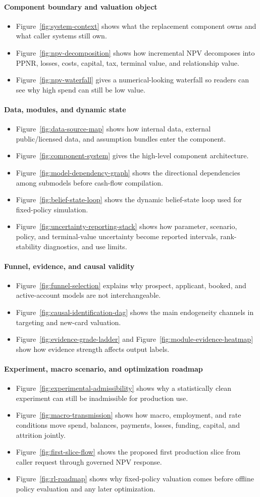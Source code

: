 \documentclass[11pt]{article}
\newcommand{\1}{\mathbf{1}}
\newcommand{\readerbox}[2]{\paragraph{#1}\begin{itemize}[leftmargin=1.5em,itemsep=0.1em,topsep=0.15em]#2\end{itemize}}
\begin{document}
\readerbox{Component boundary and valuation object}{
  \item Figure~\ref{fig:system-context} shows what the replacement component
        owns and what caller systems still own.
  \item Figure~\ref{fig:npv-decomposition} shows how incremental NPV decomposes
        into PPNR, losses, costs, capital, tax, terminal value, and relationship
        value.
  \item Figure~\ref{fig:npv-waterfall} gives a numerical-looking waterfall so
        readers can see why high spend can still be low value.
}
\readerbox{Data, modules, and dynamic state}{
  \item Figure~\ref{fig:data-source-map} shows how internal data, external
        public/licensed data, and assumption bundles enter the component.
  \item Figure~\ref{fig:component-system} gives the high-level component
        architecture.
  \item Figure~\ref{fig:model-dependency-graph} shows the directional
        dependencies among submodels before cash-flow compilation.
  \item Figure~\ref{fig:belief-state-loop} shows the dynamic belief-state loop
        used for fixed-policy simulation.
  \item Figure~\ref{fig:uncertainty-reporting-stack} shows how parameter,
        scenario, policy, and terminal-value uncertainty become reported
        intervals, rank-stability diagnostics, and use limits.
}
\readerbox{Funnel, evidence, and causal validity}{
  \item Figure~\ref{fig:funnel-selection} explains why prospect, applicant,
        booked, and active-account models are not interchangeable.
  \item Figure~\ref{fig:causal-identification-dag} shows the main endogeneity
        channels in targeting and new-card valuation.
  \item Figure~\ref{fig:evidence-grade-ladder} and
        Figure~\ref{fig:module-evidence-heatmap} show how evidence strength
        affects output labels.
}
\readerbox{Experiment, macro scenario, and optimization roadmap}{
  \item Figure~\ref{fig:experimental-admissibility} shows why a statistically
        clean experiment can still be inadmissible for production use.
  \item Figure~\ref{fig:macro-transmission} shows how macro, employment, and
        rate conditions move spend, balances, payments, losses, funding,
        capital, and attrition jointly.
  \item Figure~\ref{fig:first-slice-flow} shows the proposed first production
        slice from caller request through governed NPV response.
  \item Figure~\ref{fig:rl-roadmap} shows why fixed-policy valuation comes
        before offline policy evaluation and any later optimization.
}
\end{document}

